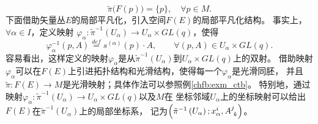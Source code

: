 \begin{equation}\label{chfb:eqn_FE-pi}
    \tilde{\pi}\bigl(F(p)\bigr)=\{p\} , \quad \forall p \in M.
\end{equation}
下面借助矢量丛$E$的局部平凡化，引入空间$F(E)$的局部平凡化结构。
事实上，$\forall \alpha \in I$，定义映射
$\varphi_{\alpha}: \tilde{\pi}^{-1}(U_{\alpha})\to U_{\alpha} \times GL(q) $，使得 
\begin{equation}\label{chfb:eqn_FE-phi}
    \varphi_{\alpha}^{-1}(p, A) \overset{def}{=} s^{(\alpha)}(p)
     \cdot A, \qquad \forall(p, A) \in U_{\alpha} \times GL(q) .
\end{equation}
容易看出，这样定义的映射$\varphi_{\alpha}$是从$\tilde{\pi}^{-1}\left(U_{\alpha}\right)$到$U_{\alpha} \times GL(q)$上的双射。
借助映射$\varphi_{\alpha}$可以在$F(E)$上引进拓扑结构和光滑结构，使得每一个$\varphi_{\alpha}$是光滑同胚，
并且$\tilde{\pi}: F(E) \rightarrow M$是光滑映射；具体作法可以参照例\ref{chfb:exm_ctb}。  
特别地，通过映射$\varphi_{\alpha}: \tilde{\pi}^{-1}(U_{\alpha}) \rightarrow U_{\alpha} \times GL(q)$以及$M$在
坐标邻域$U_{\alpha}$上的坐标映射可以给出$F(E)$在$\tilde{\pi}^{-1}(U_{\alpha})$上的局部坐标系，
记为$\left(\tilde{\pi}^{-1}\left(U_{\alpha}\right) ; x_{\alpha}^{i}, A_{\hphantom{i}k}^{j} \right)$。

